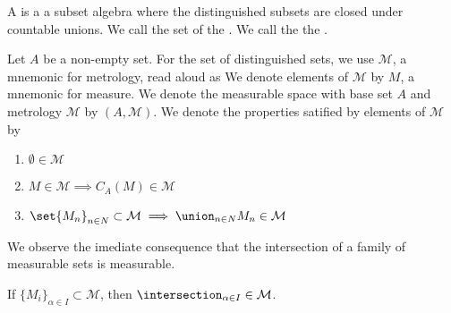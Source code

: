 
\sbasic



\sstart





A 
is a a subset algebra where
the distinguished subsets are closed under
countable unions.
We call the set of
the .
We call the
the .


Let $A$ be a non-empty set.
For the set of distinguished sets, we use
$\mathcal{M}$, a mnemonic for metrology,
read aloud as 
We denote elements of $\mathcal{M}$ by
$M$, a mnemonic for measure.
We denote the measurable space with base
set $A$ and metrology $\mathcal{M}$ by
$(A, \mathcal{M})$.
We denote the properties satified by
elements of $\mathcal{M}$ by

\begin{enumerate}
  \item
  $\emptyset \in \mathcal{M}$

  \item
  $M \in \mathcal{M} \implies
  C_{A}(M) \in \mathcal{M}$

  \item
  $\set{M_n}_{n \in N} \subset
  \mathcal{M} \implies
  \union_{n \in N} M_n \in
  \mathcal{M}$
\end{enumerate}


We observe the imediate consequence that
the intersection of a family of measurable
sets is measurable.

\begin{prop}

If $\{M_i\}_{\alpha \in I}\subset \mathcal{M}$,
then $\intersection_{\alpha \in I} \in \mathcal{M}$.

\end{prop}

\strats
